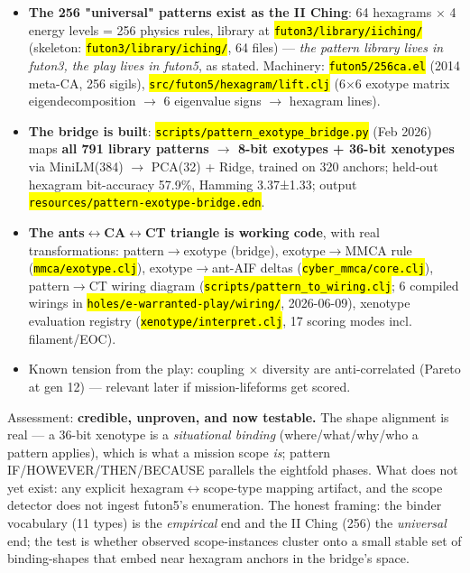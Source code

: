 \documentclass[11pt,oneside]{article}
\newcommand{\scopehl}[1]{\texttt{\hl{#1}}}
\begin{document}
\begin{phasebox}[title={2. MAP (2026-06-10) --- autopsy + the futon5 improvisation apparatus}]
\begin{subbox}[title={2.2 futon5: the patterns-of-improvisation apparatus (ACTIVE --- latest commit 2026-06-09)}]
\begin{itemize}[leftmargin=1.2em,itemsep=1pt]
\item \textbf{The 256 "universal" patterns exist as the II Ching}: 64 hexagrams $\times$ 4 energy levels = 256 physics rules, library at \scopehl{futon3/library/iiching/} (skeleton: \scopehl{futon3/library/iching/}, 64 files) --- \emph{the pattern library lives in futon3, the play lives in futon5}, as stated. Machinery: \scopehl{futon5/256ca.el} (2014 meta-CA, 256 sigils), \scopehl{src/futon5/hexagram/lift.clj} (6$\times$6 exotype matrix eigendecomposition $\rightarrow$ 6 eigenvalue signs $\rightarrow$ hexagram lines).
\item \textbf{The bridge is built}: \scopehl{scripts/pattern\_exotype\_bridge.py} (Feb 2026) maps \textbf{all 791 library patterns $\rightarrow$ 8-bit exotypes + 36-bit xenotypes} via MiniLM(384) $\rightarrow$ PCA(32) + Ridge, trained on 320 anchors; held-out hexagram bit-accuracy 57.9\%, Hamming 3.37±1.33; output \scopehl{resources/pattern-exotype-bridge.edn}.
\item \textbf{The ants$\leftrightarrow$CA$\leftrightarrow$CT triangle is working code}, with real transformations: pattern$\rightarrow$exotype (bridge), exotype$\rightarrow$MMCA rule (\scopehl{mmca/exotype.clj}), exotype$\rightarrow$ant-AIF deltas (\scopehl{cyber\_mmca/core.clj}), pattern$\rightarrow$CT wiring diagram (\scopehl{scripts/pattern\_to\_wiring.clj}; 6 compiled wirings in \scopehl{holes/e-warranted-play/wiring/}, 2026-06-09), xenotype evaluation registry (\scopehl{xenotype/interpret.clj}, 17 scoring modes incl. filament/EOC).
\item Known tension from the play: coupling $\times$ diversity are anti-correlated (Pareto at gen 12) --- relevant later if mission-lifeforms get scored.
\end{itemize}

\end{subbox}
\begin{subbox}[title={2.3 The conjecture: mission scopes as early evidence of the 256}]

Assessment: \textbf{credible, unproven, and now testable.} The shape alignment is
real --- a 36-bit xenotype is a \emph{situational binding} (where/what/why/who a
pattern applies), which is what a mission scope \emph{is}; pattern
IF/HOWEVER/THEN/BECAUSE parallels the eightfold phases. What does not yet
exist: any explicit hexagram$\leftrightarrow$scope-type mapping artifact, and the scope
detector does not ingest futon5's enumeration. The honest framing: the binder
vocabulary (11 types) is the \emph{empirical} end and the II Ching (256) the
\emph{universal} end; the test is whether observed scope-instances cluster onto a
small stable set of binding-shapes that embed near hexagram anchors in the
bridge's space.


\end{subbox}
\end{phasebox}
\end{document}
